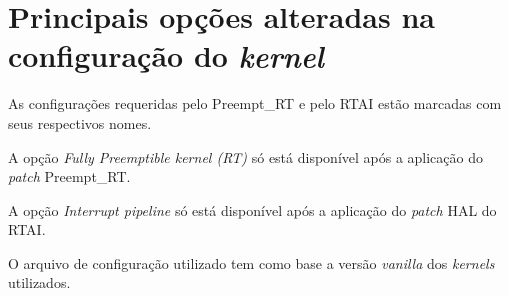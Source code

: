 \chapter{Principais opções alteradas na configuração do \textit{kernel}}
\label{cap:kernelconfig}

As configurações requeridas pelo Preempt\_RT e pelo RTAI estão marcadas com seus respectivos nomes. 

A opção \textit{Fully Preemptible kernel (RT)} só está disponível após a aplicação do \textit{patch} Preempt\_RT. 

A opção \textit{Interrupt pipeline} só está disponível após a aplicação do \textit{patch} HAL do RTAI. 

O arquivo de configuração utilizado tem como base a versão \textit{vanilla} dos \textit{kernels} utilizados.

